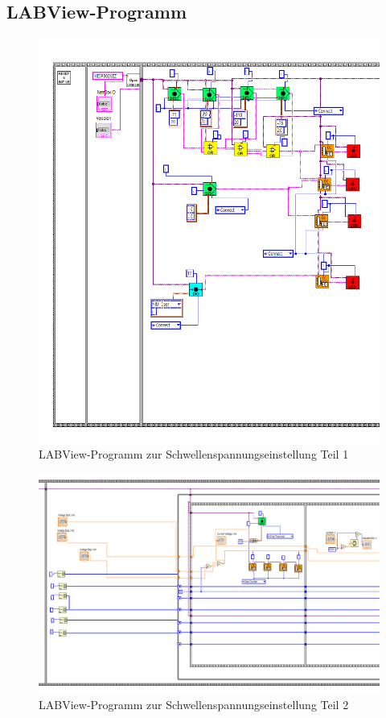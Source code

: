\documentclass{article}
\begin{document}
\subsection{LABView-Programm}
\begin{figure}
    \centering
    \includegraphics[width=1\textwidth]{figures/ProgrammScreen1.png}
    \caption{LABView-Programm zur Schwellenspannungseinstellung Teil 1}
    \label{fig:LABView1}
\end{figure}
\begin{figure}
    \centering
    \includegraphics[width=1\textwidth]{figures/ProgrammScreen2.png}
    \caption{LABView-Programm zur Schwellenspannungseinstellung Teil 2}
    \label{fig:LABView2}
\end{figure}
\end{document}
